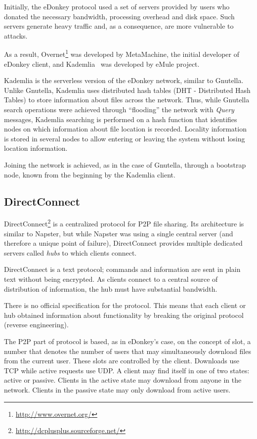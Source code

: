 Initially, the eDonkey protocol used a set of servers provided by users who
donated the necessary bandwidth, processing overhead and disk space. Such
servers generate heavy traffic and, as a consequence, are more vulnerable to
attacks.

As a result, Overnet\footnote{\url{http://www.overnet.org/}} was developed by MetaMachine, the initial developer of
eDonkey client, and Kademlia~\cite{kademlia} was developed by eMule project.

Kademlia is the serverless version of the eDonkey network, similar to
Gnutella.  Unlike Gnutella, Kademlia uses distributed hash tables (DHT -
Distributed Hash Tables) to store information about files across the network.
Thus, while Gnutella search operations were achieved through ``flooding'' the
network with \textit{Query} messages, Kademlia searching is performed on a
hash function that identifies nodes on which information about file location
is recorded. Locality information is stored in several nodes to
allow entering or leaving the system without losing location information.

Joining the network is achieved, as in the case of Gnutella, through a bootstrap
node, known from the beginning by the Kademlia client.

\subsection{DirectConnect}

DirectConnect\footnote{\url{http://dcplusplus.sourceforge.net/}} is a centralized protocol for P2P file sharing. Its architecture
is similar to Napster, but while Napster was using a single central server
(and therefore a unique point of failure), DirectConnect provides multiple
dedicated servers called \textit{hubs} to which clients connect.

DirectConnect is a text protocol; commands and information are sent in plain
text
without being encrypted. As clients connect to a central source of
distribution of information, the hub must have substantial bandwidth.

There is no official specification for the protocol. This means that each
client or hub obtained information about functionality by breaking the
original protocol (reverse engineering).

The P2P part of protocol is based, as in eDonkey's case, on the concept of
slot, a number that denotes the number of users that may simultaneously
download files from the current user. These slots are controlled by the
client. Downloads use TCP while active requests use UDP. A client may find
itself in one of two states: active or passive. Clients in the active state may
download from anyone in the network. Clients in the passive state may
only download from active users.

